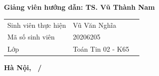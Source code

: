 \begin{titlepage}
\begin{center}
\textbf{\fontsize{16pt}{30pt}\selectfont {ĐỀ TÀI:}} \\


\textbf{\fontsize{20pt}{24pt}\selectfont {Sử dụng thiết kế hướng miền \\ xây dựng kiến trúc vi dịch vụ cho \\ bài toán hóa đơn điện tử}} \\

\end{center}

\vspace{0.7cm}

\hspace{2.4cm}\begin{minipage}{0.8\textwidth}

\textbf{Giảng viên hướng dẫn: TS. Vũ Thành Nam}

\end{minipage}

\vspace{0.7cm}

\hspace{3cm}\begin{minipage}{0.7\textwidth}

\begin{tabular}{l l l}

Sinh viên thực hiện & Vũ Văn Nghĩa \\

Mã số sinh viên & 20206205 \\

Lớp & Toán Tin 02 - K65 \\

\end{tabular}

\end{minipage}

\vspace{0.5cm}

\begin{center}

\textbf{Hà Nội, \the\month~/~\the\year}

\end{center}

\end{titlepage}

